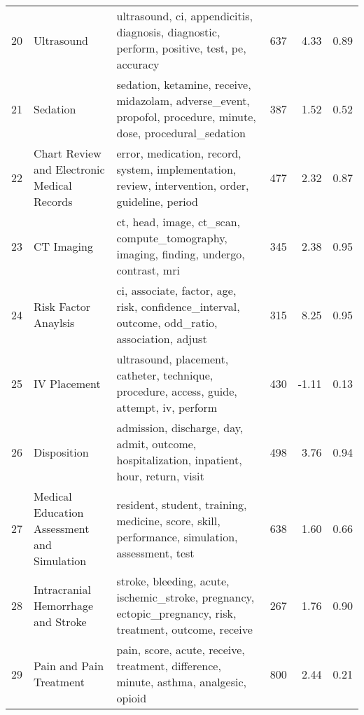 \begin{tabular}{rllrrr}
    20 &                                   Ultrasound &                                   ultrasound, ci, appendicitis, diagnosis, diagnostic, perform, positive, test, pe, accuracy &             637 &              4.33 &  0.89 \\
    21 &                                     Sedation &                sedation, ketamine, receive, midazolam, adverse\_event, propofol, procedure, minute, dose, procedural\_sedation &             387 &              1.52 &  0.52 \\
    22 &  Chart Review and Electronic Medical Records &                            error, medication, record, system, implementation, review, intervention, order, guideline, period &             477 &              2.32 &  0.87 \\
    23 &                                   CT Imaging &                                       ct, head, image, ct\_scan, compute\_tomography, imaging, finding, undergo, contrast, mri &             345 &              2.38 &  0.95 \\
    24 &                         Risk Factor Anaylsis &                               ci, associate, factor, age, risk, confidence\_interval, outcome, odd\_ratio, association, adjust &             315 &              8.25 &  0.95 \\
    25 &                                 IV Placement &                                   ultrasound, placement, catheter, technique, procedure, access, guide, attempt, iv, perform &             430 &             -1.11 &  0.13 \\
    26 &                                  Disposition &                                   admission, discharge, day, admit, outcome, hospitalization, inpatient, hour, return, visit &             498 &              3.76 &  0.94 \\
    27 &  Medical Education Assessment and Simulation &                               resident, student, training, medicine, score, skill, performance, simulation, assessment, test &             638 &              1.60 &  0.66 \\
    28 &           Intracranial Hemorrhage and Stroke &                    stroke, bleeding, acute, ischemic\_stroke, pregnancy, ectopic\_pregnancy, risk, treatment, outcome, receive &             267 &              1.76 &  0.90 \\
    29 &                      Pain and Pain Treatment &                                        pain, score, acute, receive, treatment, difference, minute, asthma, analgesic, opioid &             800 &              2.44 &  0.21 \\

\end{tabular}
